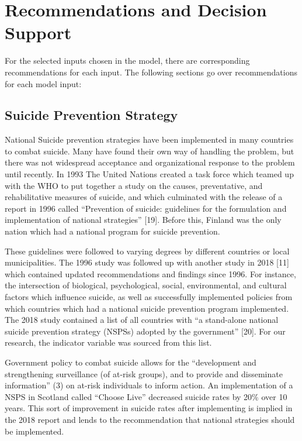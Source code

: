 \documentclass[]{article}
\begin{document}
\section{Recommendations and Decision
Support}\label{recommendations-and-decision-support}

For the selected inputs chosen in the model, there are corresponding
recommendations for each input. The following sections go over
recommendations for each model input:

\subsection{Suicide Prevention
Strategy}\label{suicide-prevention-strategy}

National Suicide prevention strategies have been implemented in many
countries to combat suicide. Many have found their own way of handling
the problem, but there was not widespread acceptance and organizational
response to the problem until recently. In 1993 The United Nations
created a task force which teamed up with the WHO to put together a
study on the causes, preventative, and rehabilitative measures of
suicide, and which culminated with the release of a report in 1996
called ``Prevention of suicide: guidelines for the formulation and
implementation of national strategies'' {[}19{]}. Before this, Finland
was the only nation which had a national program for suicide prevention.

These guidelines were followed to varying degrees by different countries
or local municipalities. The 1996 study was followed up with another
study in 2018 {[}11{]} which contained updated recommendations and
findings since 1996. For instance, the intersection of biological,
psychological, social, environmental, and cultural factors which
influence suicide, as well as successfully implemented policies from
which countries which had a national suicide prevention program
implemented. The 2018 study contained a list of all countries with ``a
stand-alone national suicide prevention strategy (NSPSs) adopted by the
government'' {[}20{]}. For our research, the indicator variable was
sourced from this list.

Government policy to combat suicide allows for the ``development and
strengthening surveillance (of at-risk groups), and to provide and
disseminate information'' (3) on at-risk individuals to inform action.
An implementation of a NSPS in Scotland called ``Choose Live'' decreased
suicide rates by 20\% over 10 years. This sort of improvement in suicide
rates after implementing is implied in the 2018 report and lends to the
recommendation that national strategies should be implemented.
\end{document}
